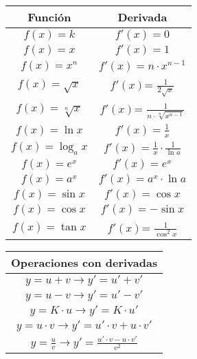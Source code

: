 \newpage


\begin{tabular}{|c|c|}\hline 
Función  & Derivada  \\ 
\hline
$f(x) = k$  & $f'(x) = 0$   \\ 
$f(x) = x$  &                     $f'(x)= 1$ \\
$f(x) = x^n$ &                    $f'(x)= n\cdot x^{n-1}$\\
$f(x) = \sqrt x $ &      $f'(x)$= $\frac{1}{{2\sqrt x }}$\\
$f(x) = \sqrt[n]{x}$  &     $f'(x)$= $\frac{1}{n\cdot\sqrt[n]{x^{n - 1}}}$\\
$f(x) = \ln{x}$ &                  $f'(x)= \frac{1}{x}$\\
$f(x) = \log_a x$ &              $f'(x)=\frac{1}{x}\cdot\frac{1}{\ln a}$\\
$f(x) = e^x$ &                     $f'(x)=e^x$\\
$f(x) = a^x$ &                     $f'(x)= a^x\cdot\ln a$\\
$f(x) = \sin x$ &               $f'(x)= \cos x$ \\
$f(x) = \cos x$  &              $f'(x)= -\sin x$\\
$f(x) = \tan x$ &                  $f'(x)$= $\frac{1}{{{{\cos }^2}x}}$\\
\hline

\end{tabular} 

\begin{tabular}{|c|}\hline 
Operaciones con derivadas  \\ 
\hline
$y=u + v \rightarrow y' = u' + v'$    \\ 
$y=u - v \rightarrow y' = u' - v'$    \\
$y=K\cdot u \rightarrow y' = K \cdot u'$    \\ 
$y=u \cdot v \rightarrow y' = u'\cdot v + u\cdot v'$    \\
$y= \frac{u}{v}  \rightarrow y' = \frac{u'\cdot v - u\cdot v'}{v^2}$    \\  
\hline

\end{tabular} 

                      




%
%
